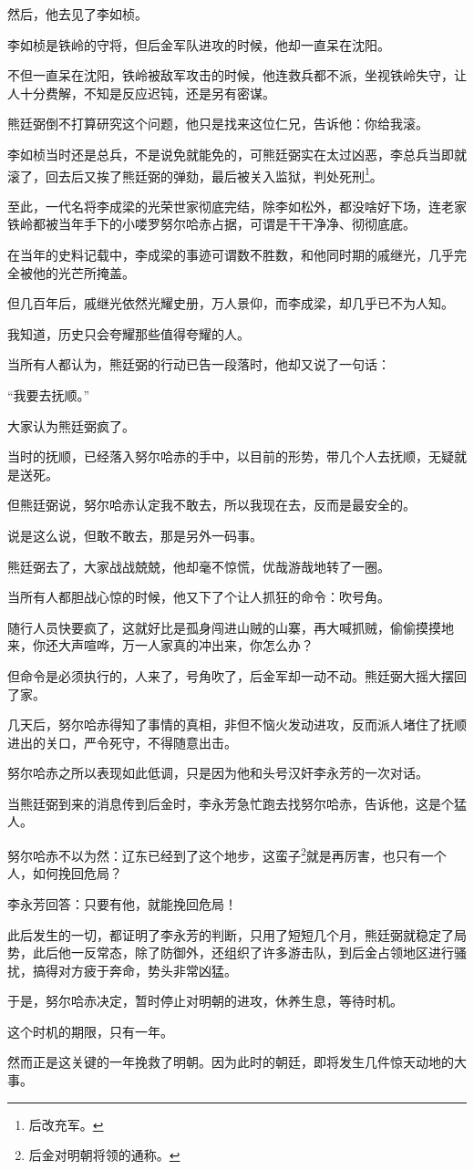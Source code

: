 \begin{multicols}{\theparacolNo}
		然后，他去见了李如桢。

		李如桢是铁岭的守将，但后金军队进攻的时候，他却一直呆在沈阳。

		不但一直呆在沈阳，铁岭被敌军攻击的时候，他连救兵都不派，坐视铁岭失守，让人十分费解，不知是反应迟钝，还是另有密谋。

		熊廷弼倒不打算研究这个问题，他只是找来这位仁兄，告诉他：你给我滚。

		李如桢当时还是总兵，不是说免就能免的，可熊廷弼实在太过凶恶，李总兵当即就滚了，回去后又挨了熊廷弼的弹劾，最后被关入监狱，判处死刑\footnote{后改充军。}。

		至此，一代名将李成梁的光荣世家彻底完结，除李如松外，都没啥好下场，连老家铁岭都被当年手下的小喽罗努尔哈赤占据，可谓是干干净净、彻彻底底。

		在当年的史料记载中，李成梁的事迹可谓数不胜数，和他同时期的戚继光，几乎完全被他的光芒所掩盖。

		但几百年后，戚继光依然光耀史册，万人景仰，而李成梁，却几乎已不为人知。

		我知道，历史只会夸耀那些值得夸耀的人。

		当所有人都认为，熊廷弼的行动已告一段落时，他却又说了一句话：

		“我要去抚顺。”

		大家认为熊廷弼疯了。

		当时的抚顺，已经落入努尔哈赤的手中，以目前的形势，带几个人去抚顺，无疑就是送死。

		但熊廷弼说，努尔哈赤认定我不敢去，所以我现在去，反而是最安全的。

		说是这么说，但敢不敢去，那是另外一码事。

		熊廷弼去了，大家战战兢兢，他却毫不惊慌，优哉游哉地转了一圈。

		当所有人都胆战心惊的时候，他又下了个让人抓狂的命令：吹号角。

		随行人员快要疯了，这就好比是孤身闯进山贼的山寨，再大喊抓贼，偷偷摸摸地来，你还大声喧哗，万一人家真的冲出来，你怎么办？

		但命令是必须执行的，人来了，号角吹了，后金军却一动不动。熊廷弼大摇大摆回了家。

		几天后，努尔哈赤得知了事情的真相，非但不恼火发动进攻，反而派人堵住了抚顺进出的关口，严令死守，不得随意出击。

		努尔哈赤之所以表现如此低调，只是因为他和头号汉奸李永芳的一次对话。

		当熊廷弼到来的消息传到后金时，李永芳急忙跑去找努尔哈赤，告诉他，这是个猛人。

		努尔哈赤不以为然：辽东已经到了这个地步，这蛮子\footnote{后金对明朝将领的通称。}就是再厉害，也只有一个人，如何挽回危局？

		李永芳回答：只要有他，就能挽回危局！

		此后发生的一切，都证明了李永芳的判断，只用了短短几个月，熊廷弼就稳定了局势，此后他一反常态，除了防御外，还组织了许多游击队，到后金占领地区进行骚扰，搞得对方疲于奔命，势头非常凶猛。

		于是，努尔哈赤决定，暂时停止对明朝的进攻，休养生息，等待时机。

		这个时机的期限，只有一年。

		然而正是这关键的一年挽救了明朝。因为此时的朝廷，即将发生几件惊天动地的大事。
		\ifnum{}
	\end{multicols}
